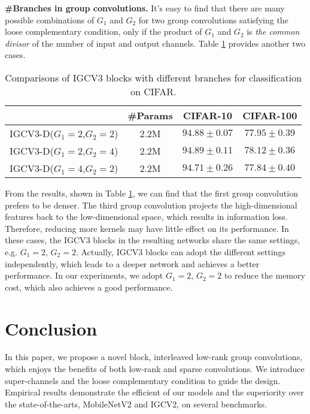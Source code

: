 \documentclass{bmvc2k}
\begin{document}
	\noindent\textbf{\#Branches in group convolutions.} It's easy to find that there are many possible combinations of $G_1$ and $G_2$ for two group convolutions satisfying the loose complementary condition, only if the product of $G_1$ and $G_2$ is \emph{the common divisor} of the number of input and output channels. Table \ref{sparsity} provides another two cases.
	\begin{table}[htb!]
		\centering
		\begin{tabular}{|c||c|c|c|}
			\hline
			& \#Params& CIFAR-10 & CIFAR-100\\
			\hline\hline
			IGCV3-D($G_1=2$,$G_2=2$) & 2.2M  & $94.88\pm0.07$ & $77.95\pm0.39$ \\
			IGCV3-D($G_1=2$,$G_2=4$) & 2.2M  & $\mathbf{94.89\pm0.11}$     &$\mathbf{78.12\pm0.36}$  \\
			IGCV3-D($G_1=4$,$G_2=2$) & 2.2M  & $94.71\pm0.26$     &$77.84\pm0.40$  \\
			\hline
		\end{tabular}
		\caption{Comparisons of IGCV$3$ blocks with different branches for classification on CIFAR.}
		\label{sparsity}
	\end{table}

	From the results, shown in Table \ref{sparsity}, we can find that the first group convolution prefers to be denser. The third group convolution projects the high-dimensional features back to the low-dimensional space, which results in information loss. Therefore, reducing more kernels may have little effect on its performance. In these cases, the IGCV$3$ blocks in the resulting networks share the same settings, e.g. $G_1=2$, $G_2=2$. Actually, IGCV$3$ blocks can adopt the different settings independently, which leads to a deeper network and achieves a better performance. In our experiments, we adopt $G_1=2$, $G_2=2$ to reduce the memory cost, which also achieves a good performance.

	\section{Conclusion}
	In this paper,
	we propose a novel block, interleaved low-rank group convolutions,
	which enjoys the benefits of both low-rank and sparse convolutions.
	We introduce super-channels and the loose complementary condition
	to guide the design.
	Empirical results demonstrate the efficient of our models and the superiority over the state-of-the-arts, MobileNetV$2$ and IGCV$2$, on several benchmarks.

	
\end{document}
